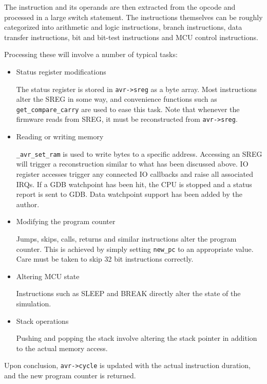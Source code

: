 The instruction and its operands are then extracted from the opcode and processed
in a large switch statement. The instructions themselves can be roughly categorized
into arithmetic and logic instructions, branch instructions, data transfer
instructions, bit and bit-test instructions and \ac{MCU} control instructions.

Processing these will involve a number of typical tasks:

\begin{itemize}
\item Status register modifications

The status register is stored in \lstinline|avr->sreg| as a byte array.
Most instructions alter the \ac{SREG} in some way, and convenience functions such as
\lstinline|get_compare_carry| are used to ease this task. Note that whenever the
firmware reads from \ac{SREG}, it must be reconstructed from \lstinline|avr->sreg|.

\item Reading or writing memory

\lstinline|_avr_set_ram| is used to write bytes to a specific address. Accessing
an \ac{SREG} will trigger a reconstruction similar to what has been discussed above.
\ac{IO} register accesses trigger any connected \ac{IO} callbacks and raise all associated
\acp{IRQ}. If a \ac{GDB} watchpoint has been hit, the \ac{CPU} is stopped and a status report
is sent to \ac{GDB}. Data watchpoint support has been added by the author.

\item Modifying the program counter

Jumps, skips, calls, returns and similar instructions alter the program counter.
This is achieved by simply setting \lstinline|new_pc| to an appropriate value. Care must be
taken to skip 32 bit instructions correctly.

\item Altering \ac{MCU} state

Instructions such as SLEEP and BREAK directly alter the state of the simulation.

\item Stack operations

Pushing and popping the stack involve altering the stack pointer in addition
to the actual memory access. 
\end{itemize}

Upon conclusion, \lstinline|avr->cycle| is updated with the actual instruction
duration, and the new program counter is returned.

